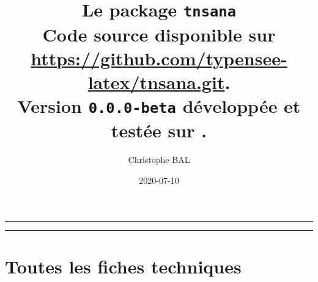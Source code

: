 \documentclass[12pt,a4paper]{article}
\begin{document}
\renewcommand\labelitemi{\raisebox{0.125em}{\tiny\textbullet}}
\renewcommand{\labelitemii}{---}

\title{ %
	Le package \texttt{tnsana}%
	\\%
	{\footnotesize Code source disponible sur \url{https://github.com/typensee-latex/tnsana.git}.}%
	\\%
    {\footnotesize Version \texttt{0.0.0-beta} développée et testée sur \macosxname{}.}%
}
\author{Christophe BAL}
\date{2020-07-10}

\maketitle


\vspace{2em}

\hrule

\tableofcontents

\vspace{1.5em}

\hrule

\newpage



\newpage
\section{Toutes les fiches techniques} \label{techincal-ids}

\end{document}
